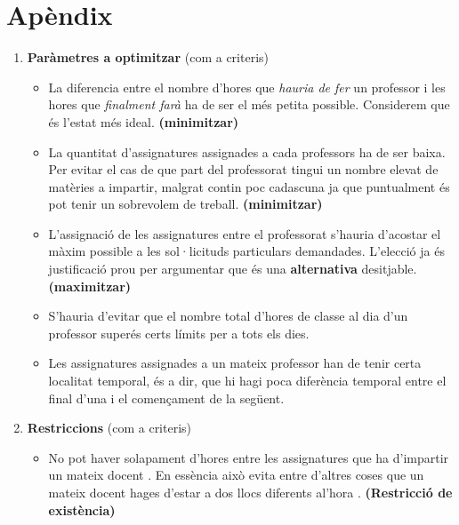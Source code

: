 \documentclass[10pt,twocolumn]{article}
\begin{document}
\section*{Apèndix}
\begin{enumerate}
	\item \textbf{Paràmetres a optimitzar } (com a criteris) 
	\begin{itemize}
		\item La diferencia entre el nombre d'hores que \textit{hauria de fer} un professor i les hores que \textit{finalment farà} ha de ser el més petita possible. {\color{gray} Considerem que és l'estat més ideal.} \textbf{(minimitzar)} 
		\item La quantitat d'assignatures assignades a cada professors ha de ser baixa. 
		{\color{gray}  Per evitar el cas de que part del professorat tingui un nombre elevat de matèries a impartir, malgrat contin poc cadascuna ja que puntualment és pot tenir un sobrevolem de treball.} \textbf{(minimitzar)}
		\item L'assignació de les assignatures entre el professorat s'hauria d'acostar el màxim possible a les sol·licituds particulars demandades. {\color{gray}  L'elecció ja és justificació prou per argumentar que és una \textbf{alternativa} desitjable.} \textbf{(maximitzar)}
		\item S'hauria d'evitar que el nombre total d'hores de classe al dia d'un professor superés certs límits per a tots els dies.
		\item Les assignatures assignades a un mateix professor han de tenir certa localitat temporal, és a dir, que hi hagi poca diferència temporal entre el final d'una i el començament de la següent.
	\end{itemize}
    \item \textbf{Restriccions} (com a criteris)
    \begin{itemize}
    	\item No pot haver solapament d'hores entre les assignatures que ha d'impartir un mateix docent . {\color{gray} En essència això evita entre d'altres coses que un mateix docent hages d'estar a dos llocs diferents al'hora .} \textbf{(Restricció de existència)} 

\end{itemize}
\end{enumerate}
\end{document}
